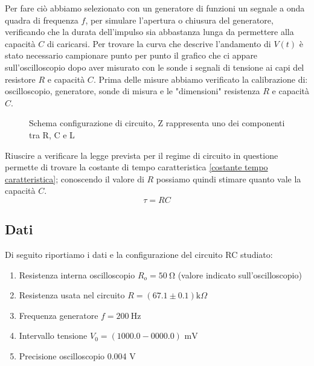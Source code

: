 \documentclass[letterpaper,12pt]{article}
\begin{document}
 Per fare ciò abbiamo selezionato con un generatore di funzioni un segnale a onda quadra di frequenza $f$, per simulare l'apertura o chiusura del generatore, verificando che la durata dell'impulso sia abbastanza lunga da permettere alla capacità $C$ di caricarsi.
 Per trovare la curva che descrive l'andamento di $V(t)$ è stato necessario campionare punto per punto il grafico che ci appare sull'oscilloscopio dopo aver  misurato con le sonde i segnali di tensione ai capi del resistore $R$ e capacità $C$. Prima delle misure abbiamo verificato la calibrazione di: oscilloscopio, generatore, sonde di misura e le "dimensioni" resistenza $R$ e capacità $C$.
\begin{figure}[h!]
    \centering
    \caption{Schema configurazione di circuito, Z rappresenta uno dei componenti tra R, C e L}
    \label{fig:config_circuito}
\end{figure}



Riuscire a verificare la legge prevista per il regime di circuito in questione permette di trovare la costante di tempo caratteristica \ref{costante tempo caratteristica}; conoscendo il valore di $R$ possiamo quindi stimare quanto vale la capacità $C$.
\begin{equation}
    \tau = RC
    \label{costante tempo caratteristica}
\end{equation}
\newpage



\subsection{Dati}
Di seguito riportiamo i dati e la configurazione del circuito RC studiato:
\begin{enumerate}[itemsep=1pt]
    \item Resistenza interna oscilloscopio $R_o = \SI{50}{\ohm}$ (valore indicato sull'oscilloscopio)
    \item Resistenza usata nel circuito $R = (67.1\pm0.1) \text{k}\Omega$
    \item Frequenza generatore $f = \SI{200}{\hertz}$
    \item Intervallo tensione $V_0= (1000.0 - 0000.0) \text{ mV}$
    \item Precisione oscilloscopio 0.004 V
\end{enumerate}
\end{document}

